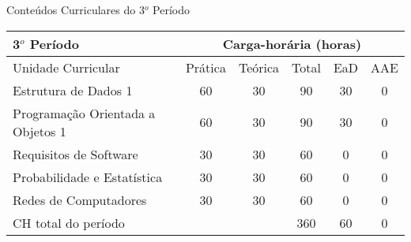 \begin{quadro}[ht!]
\centering
\caption{Conteúdos Curriculares do 3$^o$ Período}\label{qua:periodo3}
\begin{tabular}{|p{8.0cm}|c|c|c|c|c|}
\hline
\rowcolor{blue1} 3$^o$ Período & \multicolumn{5}{|c|}{\centering Carga-horária (horas)} \\ \hline
\rowcolor{blue1} Unidade Curricular & Prática & Teórica & Total & EaD & AAE \\ \hline
Estrutura de Dados 1 & 60 & 30 & 90 & 30	&	0 \\	\hline
Programação Orientada a Objetos 1  & 60 & 30 & 90 & 30	&	0 \\	\hline
Requisitos de Software & 30 & 30 & 60 & 0	&	0 \\	\hline
Probabilidade e Estatística & 30 & 30 & 60 & 0	&	0 \\	\hline
Redes de Computadores & 30 & 30 & 60 & 0	&	0 \\	\hline
CH total do período & \multicolumn{2}{p{3.3cm}|}{\cellcolor{blue1}} & 360 & 60	&	0 \\ \hline
 \end{tabular} \end{quadro}